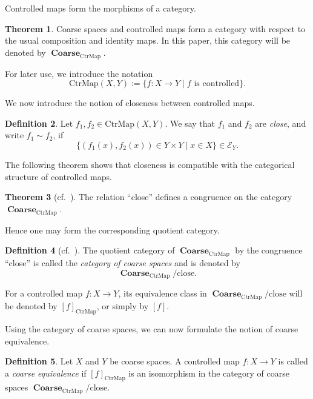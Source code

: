 \documentclass[12pt, a4paper]{amsart}
\theoremstyle{definition}
\newtheorem{theorem}{Theorem}[section]
\newtheorem{definition}[theorem]{Definition}
\newcommand{\Coarse}{\mathop{\mathbf{Coarse}}\nolimits}
\newcommand{\CtrMap}{\mathrm{CtrMap}}
\newcommand{\close}{\mathrm{close}}
\begin{document}
Controlled maps form the morphisms of a category.

\begin{theorem}
Coarse spaces and controlled maps form a category with respect to the usual
composition and identity maps.
In this paper, this category will be denoted by
$\Coarse_{\CtrMap}$.
\end{theorem}

For later use, we introduce the notation
\[
\CtrMap(X,Y)
:=
\{
f:X\to Y
\mid
f \text{ is controlled}
\}.
\]

We now introduce the notion of closeness between controlled maps.

\begin{definition}\label{definition:close_ctrmap}
Let
$f_1,f_2\in\CtrMap(X,Y)$.
We say that $f_1$ and $f_2$ are \emph{close}, and write
$f_1\sim f_2$, if
\[
\{
(f_1(x),f_2(x))
\in Y\times Y
\mid
x\in X
\}
\in
\mathcal{E}_Y.
\]
\end{definition}

The following theorem shows that closeness is compatible with the
categorical structure of controlled maps.

\begin{theorem}[cf.~\cite{DikranjanZavaCatCoarseGp2020}]
The relation ``close'' defines a congruence on the category
$\Coarse_{\CtrMap}$.
\end{theorem}

Hence one may form the corresponding quotient category.

\begin{definition}[cf.~\cite{LeitnerVigolo2023}]
The quotient category of
$\Coarse_{\CtrMap}$
by the congruence ``close'' is called the
\emph{category of coarse spaces} and is denoted by
\[
\Coarse_{\CtrMap}/\close.
\]
\end{definition}

For a controlled map
$f:X\to Y$,
its equivalence class in
$\Coarse_{\CtrMap}/\close$
will be denoted by
$[f]_{\CtrMap}$,
or simply by $[f]$.

Using the category of coarse spaces, we can now formulate the notion of
coarse equivalence.

\begin{definition}\label{definition:coarse_eq}
Let $X$ and $Y$ be coarse spaces.
A controlled map
$f:X\to Y$
is called a \emph{coarse equivalence} if
$[f]_{\CtrMap}$
is an isomorphism in the category of coarse spaces
$\Coarse_{\CtrMap}/\close$.
\end{definition}
\end{document}
